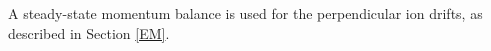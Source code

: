 \documentclass[11pt,letterpaper]{article}
\begin{document}
A steady-state momentum balance is used for the perpendicular ion drifts, as described in Section \ref{EM}.

\end{document}
